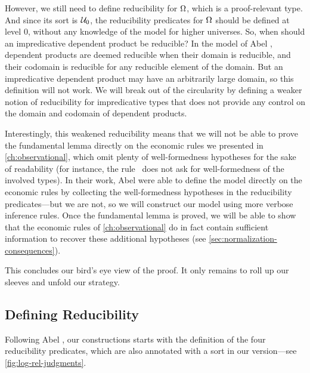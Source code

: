 However, we still need to define reducibility for \( \Omega \),
which is a proof-relevant type. And since its sort is \( \mathcal{U}_0 \), the 
reducibility predicates for \( \Omega \) should be defined at level 0, without
any knowledge of the model for higher universes. 
% 
So, when should an impredicative dependent product be reducible?
% 
In the model of Abel \etal, dependent products are deemed reducible when
their domain is reducible, and their codomain is reducible 
for any reducible element of the domain. 
% 
But an impredicative dependent product may have an arbitrarily large domain,
so this definition will not work.
% 
We will break out of the circularity by defining a weaker notion of reducibility 
for impredicative types that does not provide any control on the domain and 
codomain of dependent products.

Interestingly, this weakened reducibility means that we will not be able to prove 
the fundamental lemma directly on the economic rules we presented 
in \cref{ch:observational}, which omit plenty of well-formedness hypotheses for 
the sake of readability 
% 
(for instance, the rule~ does not ask for 
well-formedness of the involved types).
% 
In their work, Abel \etal were able to define the model directly on the economic 
rules by collecting the well-formedness hypotheses in the reducibility predicates---but 
we are not, so we will construct our model using more verbose inference rules.
% 
Once the fundamental lemma is proved, we will be able to show that the economic 
rules of \cref{ch:observational} do in fact contain sufficient information to 
recover these additional hypotheses (see \cref{sec:normalization-consequences}).

This concludes our bird's eye view of the proof. It only remains to roll up our 
sleeves and unfold our strategy.
% 

\subsection{Defining Reducibility}
\label{sec:reducbility-proof-rel}

Following Abel \etal \cite{Abel:POPL2018}, our constructions starts with the 
definition of the four reducibility predicates, which are also annotated with
a sort in our version---see \cref{fig:log-rel-judgments}.

